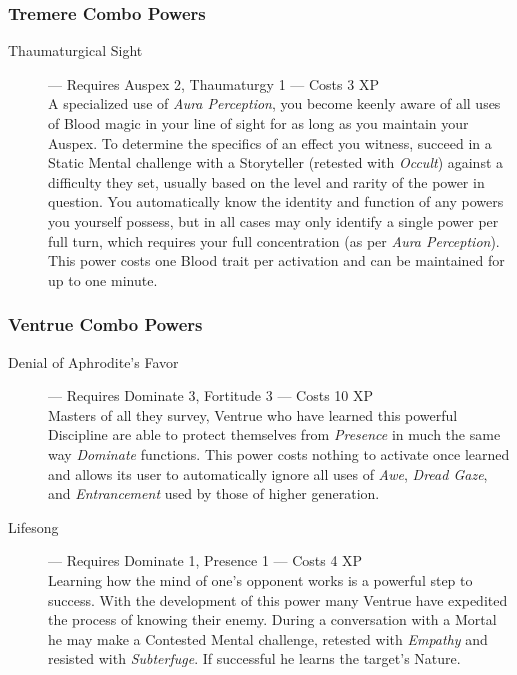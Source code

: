 \subsubsection{Tremere Combo Powers}
\begin{description}
	\item[Thaumaturgical Sight]--- Requires Auspex 2, Thaumaturgy 1 --- Costs 3 XP \\
	A specialized use of \emph{Aura Perception}, you become keenly aware of all uses of Blood 
	magic in your line of sight for as long as you maintain your Auspex.  To determine the specifics 
	of an effect you witness, succeed in a Static Mental challenge with a Storyteller (retested with 
	\emph{Occult}) against a difficulty they set, usually based on the level and rarity of the power 
	in question.  You automatically know the identity and function of any powers you yourself possess, 
	but in all cases may only identify a single power per full turn, which requires your full concentration 
	(as per \emph{Aura Perception}).  This power costs one Blood trait per activation and can be maintained 
	for up to one minute.
\end{description}

\subsubsection{Ventrue Combo Powers}
\begin{description}
	\item[Denial of Aphrodite's Favor]--- Requires Dominate 3, Fortitude 3 --- Costs 10 XP \\
	Masters of all they survey, Ventrue who have learned this powerful Discipline are able to 
	protect themselves from \emph{Presence} in much the same way \emph{Dominate} functions.  
	This power costs nothing to activate once learned and allows its user to automatically 
	ignore all uses of \emph{Awe}, \emph{Dread Gaze}, and \emph{Entrancement} used by those 
	of higher generation.
	\item[Lifesong]--- Requires Dominate 1, Presence 1 --- Costs 4 XP \\
	Learning how the mind of one's opponent works is a powerful step to success.  With the 
	development of this power many Ventrue have expedited the process of knowing their 
	enemy.  During a conversation with a Mortal he may make a Contested Mental challenge, 
	retested with \emph{Empathy} and resisted with \emph{Subterfuge}.  If successful he 
	learns the target's Nature.
\end{description}